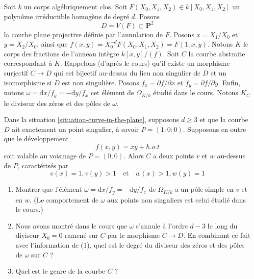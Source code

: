 \begin{situation}
\label{situation-curve-in-the-plane}
Soit $k$ un corps algébriquement clos. Soit
$F(X_0, X_1, X_2) \in k[X_0, X_1, X_2]$ un polynôme irréductible
homogène de degré $d$. Posons
$$
D = V(F) \subset \mathbf{P}^2
$$
la courbe plane projective définie par l'annulation de $F$.
Posons $x = X_1/X_0$ et $y = X_2/X_0$, ainsi que
$f(x, y) = X_0^{-d}F(X_0, X_1, X_2) = F(1, x, y)$.
Notons $K$ le corps des fractions de l'anneau intègre $k[x, y]/(f)$.
Soit $C$ la courbe abstraite correspondant à $K$.
Rappelons (d'après le cours) qu'il existe un morphisme surjectif $C \to D$
qui est bijectif au-dessus du lieu non singulier de $D$ et un
isomorphisme si $D$ est non singulière.
Posons $f_x = \partial f/\partial x$ et $f_y = \partial f/\partial y$.
Enfin, notons $\omega = \text{d}x/f_y = - \text{d}y/f_x$ cet
élément de $\Omega_{K/k}$ étudié dans le cours.
Notons $K_C$ le diviseur des zéros et des pôles de $\omega$.
\end{situation}

\begin{exercise}
\label{exercise-node-in-the-plane}
Dans la situation \ref{situation-curve-in-the-plane}, supposons
$d \geq 3$ et que la courbe $D$ ait exactement un point singulier,
à savoir $P = (1 : 0 : 0)$. Supposons en outre que le développement
$$
f(x, y) = xy + h.o.t
$$
soit valable au voisinage de $P = (0, 0)$. Alors $C$ a deux points $v$ et $w$ au-dessus de
$P$, caractérisés par
$$
v(x) = 1, v(y) > 1
\quad\text{et}\quad
w(x) > 1, w(y) = 1
$$
\begin{enumerate}
\item Montrer que l'élément
$\omega = \text{d}x/f_y = - \text{d}y/f_x$ de $\Omega_{K/k}$
a un pôle simple en $v$ et en $w$. (Le comportement de
$\omega$ aux points non singuliers est celui étudié dans le cours.)
\item Nous avons montré dans le cours que $\omega$ s'annule à l'ordre
$d - 3$ le long du diviseur $X_0 = 0$ ramené sur $C$ par le morphisme
$C \to D$. En combinant ce fait avec l'information de (1), quel est le degré
du diviseur des zéros et des pôles de $\omega$ sur $C$ ?
\item Quel est le genre de la courbe $C$ ?
\end{enumerate}
\end{exercise}

